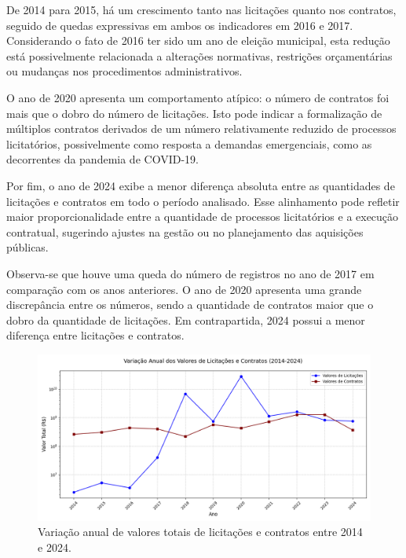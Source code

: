 \documentclass[
	12pt,				%
	oneside,			%
	a4paper,			%
	chapter=TITLE,		%
	section=TITLE,		%
	english,			%
	brazil				%
	]{abntex2}
\begin{document}
De 2014 para 2015, há um crescimento tanto nas licitações quanto nos contratos, seguido de quedas expressivas em ambos os indicadores em 2016 e 2017. Considerando o fato de 2016 ter sido um ano de eleição municipal, esta redução está possivelmente relacionada a alterações normativas, restrições orçamentárias ou mudanças nos procedimentos administrativos.

O ano de 2020 apresenta um comportamento atípico: o número de contratos foi mais que o dobro do número de licitações. Isto pode indicar a formalização de múltiplos contratos derivados de um número relativamente reduzido de processos licitatórios, possivelmente como resposta a demandas emergenciais, como as decorrentes da pandemia de COVID-19.

Por fim, o ano de 2024 exibe a menor diferença absoluta entre as quantidades de licitações e contratos em todo o período analisado. Esse alinhamento pode refletir maior proporcionalidade entre a quantidade de processos licitatórios e a execução contratual, sugerindo ajustes na gestão ou no planejamento das aquisições públicas.

Observa-se que houve uma queda do número de registros no ano de 2017 em comparação com os anos anteriores. O ano de 2020 apresenta uma grande discrepância entre os números, sendo a quantidade de contratos maior que o dobro da quantidade de licitações. Em contrapartida, 2024 possui a menor diferença entre licitações e contratos.

\begin{figure}[h]
	\begin{center}
		\caption{\label{fig:variacao_licitacoes}Variação anual de valores totais de licitações e contratos entre 2014 e 2024.}
		\includegraphics[scale=0.41]{images/variacao_anual_valores.png} %
	\end{center}
\end{figure}
\end{document}
